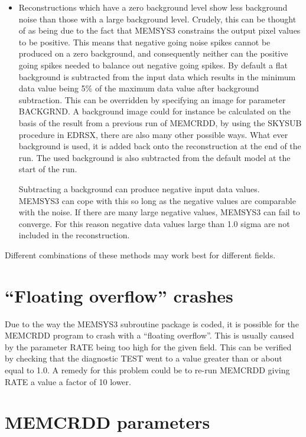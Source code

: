 \begin {itemize}
\item Reconstructions which have a zero background level show less background 
noise than those with a large background level. Crudely, this can be thought of
as being due to the fact that MEMSYS3 constrains the output pixel values to be
positive. This means that negative going noise spikes cannot be produced on a
zero background, and consequently neither can the positive going spikes needed
to balance out negative going spikes. By default a flat background is
subtracted from the input data which results in the minimum data value being
5\% of the maximum data value after background subtraction. This can be
overridden by specifying an image for parameter BACKGRND. A background image
could for instance be calculated on the basis of the result from a previous run
of MEMCRDD, by using the SKYSUB procedure in EDRSX, there are also many other
possible ways. What ever background is used, it is added back onto the
reconstruction at the end of the run. The used background is also subtracted
from the default model at the start of the run. 

Subtracting a background can produce negative input data values. MEMSYS3 can
cope  with this so long as the negative values are comparable with the noise.
If there  are many large negative values, MEMSYS3 can fail to converge. For
this reason  negative data values large than 1.0 sigma are not included in the 
reconstruction.

\end {itemize}

Different combinations of these methods may work best for different fields.

\section {``Floating overflow'' crashes}

Due to the way the MEMSYS3 subroutine package is coded, it is possible for the 
MEMCRDD program to crash with a ``floating overflow''. This is usually caused
by  the parameter RATE being too high for the given field. This can be verified
by  checking that the diagnostic TEST went to a value greater than or about
equal to  1.0. A remedy for this problem could be to re-run MEMCRDD giving RATE
a value a  factor of 10 lower.

\appendix 
\section {MEMCRDD parameters}
\label {APP:PARS}

